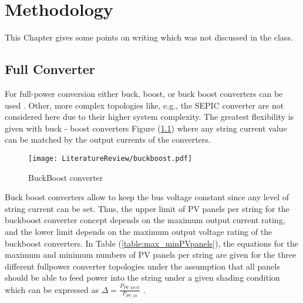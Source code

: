 \chapter{Methodology}
This Chapter gives some points on writing which was not discussed in the class.

\section{Full Converter}
For full-power conversion either buck, boost, or buck \textendash boost converters can be used \cite{a1}. 
Other, more complex topologies like, e.g., the SEPIC converter are not considered here due to 
their higher system complexity.
The greatest flexibility is given with buck - boost converters Figure (\ref{fig:buckboost}) where
any string current value can be matched by the output currents of the converters.

\begin{figure}[h]
	\begin{center}
	\texttt{[image: LiteratureReview/buckboost.pdf]}
	\caption{Buck\textendash Boost converter}
	\label{fig:buckboost}
	\end{center}
\end{figure}

Buck \textendash boost converters allow to keep the bus voltage constant since any level of 
string current can be set. Thus, the upper limit of PV panels per string for the buck\textendash boost 
converter concept depends on the maximum output current rating, and the lower limit depends on the 
maximum output voltage rating of the buck\textendash boost converters. In Table (\ref{table:max_minPVpanels}),
the equations for the maximum and minimum numbers of PV panels per string are given for the 
three different full\textendash power converter topologies under the assumption that all panels 
should be able to feed power into the string under a given shading condition which can be 
expressed as $\Delta = \frac{P_{PV,unsh}}{P_{PV,sh}}$ . 

